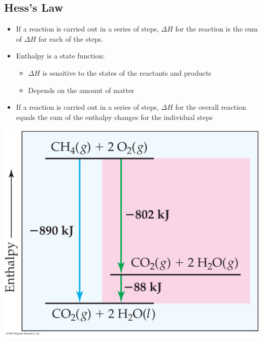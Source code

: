 \documentclass[10pt]{article}
\begin{document}
\subsection*{Hess's Law}
\begin{itemize}
    \item If a reaction is carried out in a series of steps, $\Delta H$ for the reaction is the sum of $\Delta H$ for each of the steps.
    \item Enthalpy is a state function:
    \begin{itemize}
        \item $\Delta H$ is sensitive to the states of the reactants and products
        \item Depends on the amount of matter
    \end{itemize}
    \item If a reaction is carried out in a series of steps, $\Delta H$ for the overall reaction equals the sum of the enthalpy changes for the individual steps
\end{itemize}
\begin{center}
    \includegraphics*[scale=0.6]{W4_1.png}
\end{center} 
\end{document}
